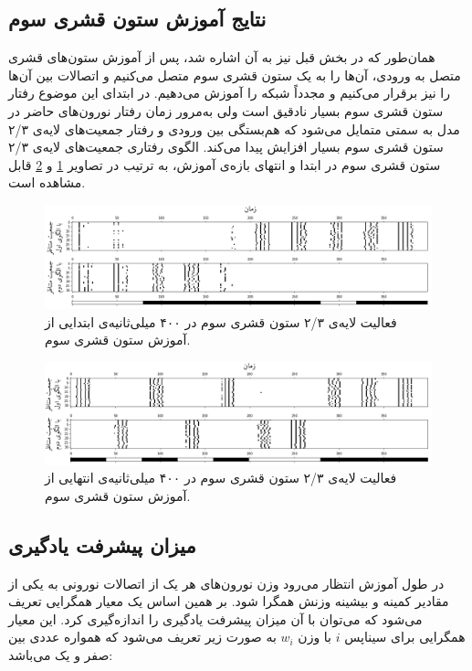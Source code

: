 \documentclass[12pt]{report}
\begin{document}
	\subsection{نتایج آموزش ستون قشری سوم}
	
	همان‌طور که در بخش قبل‌ نیز به آن اشاره شد، پس از آموزش ستون‌های قشری متصل به ورودی، آن‌ها را به یک ستون قشری سوم متصل می‌کنیم و اتصالات بین آن‌ها را نیز برقرار می‌کنیم و مجدداً شبکه را آموزش می‌دهیم. در ابتدای این موضوع رفتار ستون قشری سوم بسیار نادقیق است ولی به‌مرور زمان رفتار نورون‌های حاضر در مدل به سمتی متمایل می‌شود که هم‌بستگی بین ورودی و رفتار جمعیت‌های لایه‌ی ۲/۳ ستون قشری سوم بسیار افزایش پیدا می‌کند. الگوی رفتاری جمعیت‌های لایه‌ی ۲/۳ ستون قشری سوم در ابتدا و انتهای بازه‌ی آموزش، به ترتیب در تصاویر ‌\ref{fig:c3-begining} و \ref{fig:c3-final} قابل مشاهده است.
	
	\begin{figure}[]
		\centering
		\includegraphics[width=1.0\linewidth]{c3-begining.png}
		\caption[NS]{
			فعالیت لایه‌ی ۲/۳ ستون قشری سوم در ۴۰۰ میلی‌ثانیه‌ی ابتدایی از آموزش ستون قشری سوم.
		}
		\label{fig:c3-begining} 
	\end{figure}

\begin{figure}[]
	\centering
	\includegraphics[width=1.0\linewidth]{c3-final.png}
	\caption[NS]{
	فعالیت لایه‌ی ۲/۳ ستون قشری سوم در ۴۰۰ میلی‌ثانیه‌ی انتهایی از آموزش ستون قشری سوم.
	}
	\label{fig:c3-final} 
\end{figure}
	
	\subsection{میزان پیشرفت یادگیری}
	
	در طول آموزش انتظار می‌رود وزن نورون‌های هر یک از اتصالات نورونی به یکی از مقادیر کمینه و بیشینه وزنش همگرا شود. بر همین اساس یک معیار همگرایی تعریف می‌شود که می‌توان با آن میزان پیشرفت یادگیری را اندازه‌گیری کرد. این معیار همگرایی برای سیناپس $i$ با وزن $w_i$ به صورت زیر تعریف می‌شود که همواره عددی بین صفر و یک می‌باشد:
	
\end{document}
